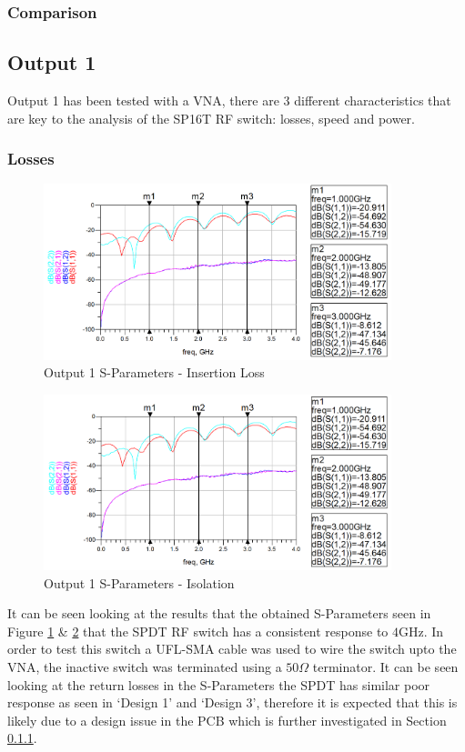 \documentclass[12pt,openany,a4paper]{book}
\begin{document}
\subsubsection{Comparison}






\subsection{Output 1}
Output 1 has been tested with a VNA, there are $3$ different characteristics that are key to the analysis of the SP16T RF switch: losses, speed and power.

\subsubsection{Losses}
\begin{figure}[H]
	\centering
	\includegraphics[width=0.9\textwidth]{output1-open.png}
	\caption{Output 1 S-Parameters - Insertion Loss}
	\label{fig:output1_1}
\end{figure} 
\begin{figure}[H]
	\centering
	\includegraphics[width=0.9\textwidth]{output1.png}
	\caption{Output 1 S-Parameters - Isolation}
	\label{fig:output1_2}
\end{figure} 
It can be seen looking at the results that the obtained S-Parameters seen in Figure \ref{fig:output1_1} \& \ref{fig:output1_2} that the SPDT RF switch has a consistent response to $4$GHz. In order to test this switch a UFL-SMA cable was used to wire the switch upto the VNA, the inactive switch was terminated using a $50\Omega$ terminator. It can be seen looking at the return losses in the S-Parameters the SPDT has similar poor response as seen in `Design 1' and `Design 3', therefore it is expected that this is likely due to a design issue in the PCB which is further investigated in Section \ref{}.\\
\end{document}
